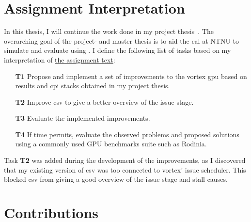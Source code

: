 

\section{Assignment Interpretation} \label{sec:tasks}

In this thesis, I will continue the work done in my project thesis~\cite{Aurud_Project}. The overarching goal of the project- and master thesis is to aid the \Acrfull{cal} at NTNU to simulate and evaluate  using . I define the following list of tasks based on my interpretation of \hyperref[chap:assignment]{the assignment text}:

\begin{itemize}
    \item[\textbf{T1}] Propose and implement a set of improvements to the \Gls{vortex} \acrshort{gpu} based on results and \acrshort{cpi} stacks obtained in my project thesis.
    \item[\textbf{T2}] Improve \acrshort{csv} to give a better overview of the issue stage. 
    \item[\textbf{T3}] Evaluate the implemented improvements.
    \item[\textbf{T4}] If time permits, evaluate the observed problems and proposed solutions using a commonly used GPU benchmarks suite such as Rodinia.
\end{itemize}

Task \textbf{T2} was added during the development of the improvements, as I discovered that my existing version of \acrshort{csv} was too connected to \Gls{vortex}' issue scheduler. This blocked \acrshort{csv} from giving a good overview of the issue stage and stall causes.

\section{Contributions} \label{sec:contributions}

